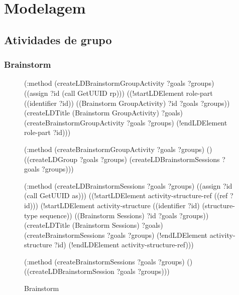 

\chapter{Modelagem}
\label{ape:modelagem}






\section{Atividades de grupo}

\subsection{Brainstorm}

\begin{figure}[htbp]
\centering
\begin{apejshopcode}
   (:method (createLDBrainstormGroupActivity ?goals ?groups)
      ((assign ?id (call GetUUID rp)))
      ((!startLDElement role-part ((identifier ?id))
                        ((Brainstorm GroupActivity) ?id ?goals ?groups))
       (createLDTitle (Brainstorm GroupActivity) ?goals)
       (createBrainstormGroupActivity ?goals ?groups)
       (!endLDElement role-part ?id)))
   
   (:method (createBrainstormGroupActivity ?goals ?groups)
      ()
      ((createLDGroup ?goals ?groups)
       (createLDBrainstormSessions ?goals ?groups)))
   
   (:method (createLDBrainstormSessions ?goals ?groups)
      ((assign ?id (call GetUUID as)))
      ((!startLDElement activity-structure-ref ((ref ?id)))
       (!startLDElement activity-structure ((identifier ?id)
                                            (structure-type sequence))
                        ((Brainstorm Sessions) ?id ?goals ?groups))
       (createLDTitle (Brainstorm Sessions) ?goals)
       (createBrainstormSessions ?goals ?groups)
       (!endLDElement activity-structure ?id)
       (!endLDElement activity-structure-ref)))
   
   (:method (createBrainstormSessions ?goals ?groups)
      ()
      ((createLDBrainstormSession ?goals ?groups)))
\end{apejshopcode}
\caption{Brainstorm}
\end{figure}
